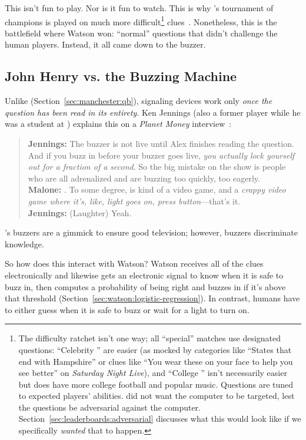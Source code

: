 This isn't fun to play.
%
Nor is it fun to watch.
%
This is why \jeopardy{}'s tournament of champions is played on much more
difficult\footnote{The difficulty ratchet isn't one way; all ``special'' matches use designated questions: ``Celebrity
  \jeopardy{}'' are easier (as mocked by categories like ``States that end
  with Hampshire'' or clues like ``You wear these on your face to help you see
  better'' on \textit{Saturday Night Live}), and ``College \jeopardy{}'' isn't
  necessarily easier but does have more college football and popular music.
  Questions are tuned to expected players' abilities.   did not want the computer to be targeted,
  lest the questions be adversarial against the computer.
  Section~\ref{sec:leaderboards:adversarial} discusses what this would look like if we
  specifically \emph{wanted} that to happen.} clues~\citep{harris-06}.
%
Nonetheless, this is the battlefield where Watson won: ``normal''
questions that didn't challenge the human players.
%
Instead, it all came down to the buzzer.

\subsection{John Henry vs. the Buzzing Machine}
\label{sec:watson:human-buzzing}

Unlike \qb{} (Section~\ref{sec:manchester:qb}), \jeopardy{} signaling
devices work only \emph{once the question has been read in its
entirety}.
%
Ken Jennings (also a former \qb{} player while he was a student at
) explains this on a \textit{Planet Money}
interview~\citep{malone-19}:
\begin{quote}
{\bf Jennings:} The buzzer is
    not live until Alex finishes reading the question. And if you buzz
    in before your buzzer goes live, \emph{you actually lock yourself out
    for a fraction of a second}. So the big mistake on the show is
    people who are all adrenalized and are buzzing too quickly, too
    eagerly. \\
{\bf Malone:} . To some degree, \jeopardy{} is kind of a video game, and a \emph{crappy video game where it's, like, light goes on, press button}---that's it. \\
{\bf Jennings:} (Laughter) Yeah. \\
\end{quote}
\jeopardy{}'s buzzers are a gimmick to ensure good television; however, \qb{}
buzzers discriminate knowledge.

So how does this interact with Watson?
%
Watson receives all of the clues electronically and likewise gets an
electronic signal to know when it is safe to buzz in, then computes a
probability of being right and buzzes in if it's above that threshold
(Section~\ref{sec:watson:logistic-regression}).
%
In contrast, humans have to either guess when it is safe to buzz or
wait for a light to turn on.

